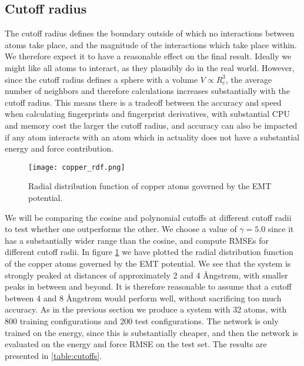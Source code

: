\subsection{Cutoff radius}
The cutoff radius defines the boundary outside of which no interactions
between atoms take place, and the magnitude of the interactions
which take place within. We therefore expect it to have a reasonable
effect on the final result. Ideally we might like all atoms to interact,
as they plausibly do in the real world.
However, since the cutoff radius defines a sphere
with a volume $V \propto R_c^3$, the average number of neighbors and therefore
calculations increases substantially with the cutoff radius.
This means there is a tradeoff
between the accuracy and speed when calculating fingerprints and
fingerprint derivatives, with substantial CPU and memory cost the
larger the cutoff radius, and accuracy can also be impacted if any
atom interacts with an atom which in actuality does not have a substantial
energy and force contribution.

\begin{figure}[H]
    \centering
    \texttt{[image: copper\_rdf.png]}
    \caption{Radial distribution function of copper atoms
        governed by the EMT potential.}
    \label{fig:copper-rdf}
\end{figure}

We will be comparing the cosine and polynomial cutoffs at different
cutoff radii to test whether one outperforms the other.
We choose a value of $\gamma = 5.0$ since it has a substantially wider
range than the cosine, and compute RMSEs for different cutoff radii.
In figure \ref{fig:copper-rdf} we have plotted the radial distribution
function of the copper atoms governed by the EMT potential.
We see that the system is strongly peaked at distances of approximately
2 and 4 Ångstrøm, with smaller peaks in between and beyond.
It is therefore reasonable to assume that a cutoff between 4
and 8 Ångstrøm would perform well, without sacrificing too much
accuracy.
As in the previous section we produce a system with 32 atoms, with
800 training configurations and 200 test configurations. The network
is only trained on the energy, since this is substantially cheaper,
and then the network is evaluated on the energy and force RMSE
on the test set. The results are presented in \ref{table:cutoffs}.

